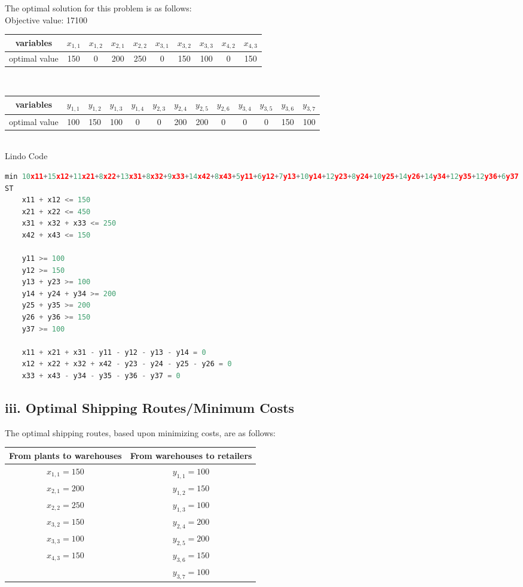 \documentclass[11pt]{scrreprt}
\begin{document}
The optimal solution for this problem is as follows:\\

Objective value: 17100\\

\begin{tabular}{|c|c|c|c|c|c|c|c|c|c|}
	\hline variables & $x_{1,1}$   &  $x_{1,2}$ & $x_{2,1}$ & $x_{2,2}$ & $x_{3,1}$ & $x_{3,2}$ & $x_{3,3}$ & $x_{4,2}$ & $x_{4,3}$      \\
	\hline optimal value & 150  &  0 & 200 & 250 & 0 & 150 & 100 & 0 & 150            \\
	\hline
\end{tabular} \\

\begin{tabular}{|c|c|c|c|c|c|c|c|c|c|c|c|c|}
	\hline variables & $y_{1,1}$ & $y_{1,2}$ & $y_{1,3}$ & $y_{1,4}$ & $y_{2,3}$ & $y_{2,4}$ & $y_{2,5}$ & $y_{2,6}$ & $y_{3,4}$ & $y_{3,5}$ & $y_{3,6}$ & $y_{3,7}$  \\
	\hline optimal value & 	100 & 150 & 100 & 0 & 0 & 200 & 200 & 0 & 0 & 0 & 150 & 100 \\
	 \hline
\end{tabular} \\

Lindo Code

\begin{lstlisting}[language=c]
min 10x11+15x12+11x21+8x22+13x31+8x32+9x33+14x42+8x43+5y11+6y12+7y13+10y14+12y23+8y24+10y25+14y26+14y34+12y35+12y36+6y37
ST
	x11 + x12 <= 150
	x21 + x22 <= 450
	x31 + x32 + x33 <= 250
	x42 + x43 <= 150

	y11 >= 100
	y12 >= 150
	y13 + y23 >= 100
	y14 + y24 + y34 >= 200
	y25 + y35 >= 200
	y26 + y36 >= 150
	y37 >= 100

	x11 + x21 + x31 - y11 - y12 - y13 - y14 = 0
	x12 + x22 + x32 + x42 - y23 - y24 - y25 - y26 = 0
	x33 + x43 - y34 - y35 - y36 - y37 = 0
\end{lstlisting}

\subsection{iii. Optimal Shipping Routes/Minimum Costs}
The optimal shipping routes, based upon minimizing costs, are as follows: \\

\begin{tabular}{|c|c|}
	\hline From plants to warehouses & From warehouses to retailers \\
	\hline $x_{1,1} = 150$ & $y_{1,1} = 100$ \\
	\hline $x_{2,1} = 200$ &$y_{1,2} = 150$ \\
	\hline $x_{2,2} = 250$ &$y_{1,3} = 100$ \\
	\hline $x_{3,2} = 150$ &$y_{2,4} = 200$ \\
	\hline $x_{3,3} = 100$ & $y_{2,5} = 200$  \\
	\hline $x_{4,3} = 150$ & $y_{3,6} = 150$  \\
	\hline & $y_{3,7} = 100$ \\
	\hline
\end{tabular} \\
\end{document}
